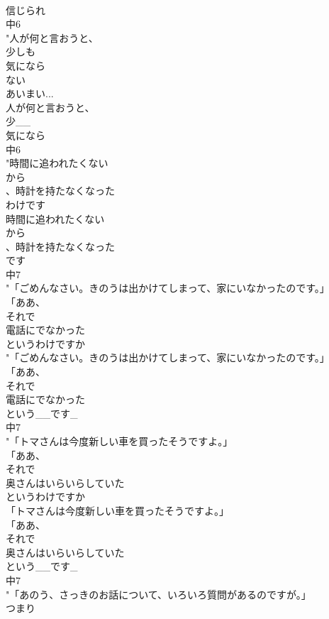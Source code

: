 \documentclass[8pt]{extreport}
\begin{document}
\begin{CJK}{UTF8}{min}
\\	信じられ
\\	中6
\\	"人が何と言おうと、
\\	少しも
\\	気になら
\\	ない
\\	あいまい...
\\	人が何と言おうと、
\\	少__
\\	気になら
\\	中6
\\	"時間に追われたくない
\\	から
\\	、時計を持たなくなった
\\	わけです
\\	時間に追われたくない
\\	から
\\	、時計を持たなくなった
\\	です
\\	中7
\\	"「ごめんなさい。きのうは出かけてしまって、家にいなかったのです。」
\\	「ああ、
\\	それで
\\	電話にでなかった
\\	というわけですか
\\	"「ごめんなさい。きのうは出かけてしまって、家にいなかったのです。」
\\	「ああ、
\\	それで
\\	電話にでなかった
\\	という__です_
\\	中7
\\	"「トマさんは今度新しい車を買ったそうですよ。」
\\	「ああ、
\\	それで
\\	奥さんはいらいらしていた
\\	というわけですか
\\	「トマさんは今度新しい車を買ったそうですよ。」
\\	「ああ、
\\	それで
\\	奥さんはいらいらしていた
\\	という__です_
\\	中7
\\	"「あのう、さっきのお話について、いろいろ質問があるのですが。」
\\	つまり

\end{CJK}
\end{document}
